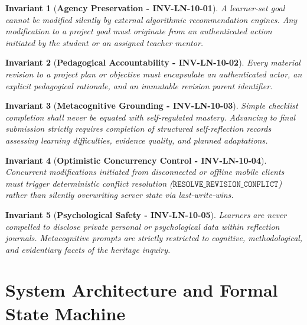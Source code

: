 \documentclass[11pt,a4paper]{article}
\newtheorem{invariant}{Invariant}
\begin{document}
\begin{invariant}[\textbf{Agency Preservation - INV-LN-10-01}]
A learner-set goal cannot be modified silently by external algorithmic recommendation engines. Any modification to a project goal must originate from an authenticated action initiated by the student or an assigned teacher mentor.
\end{invariant}

\begin{invariant}[\textbf{Pedagogical Accountability - INV-LN-10-02}]
Every material revision to a project plan or objective must encapsulate an authenticated actor, an explicit pedagogical rationale, and an immutable revision parent identifier.
\end{invariant}

\begin{invariant}[\textbf{Metacognitive Grounding - INV-LN-10-03}]
Simple checklist completion shall never be equated with self-regulated mastery. Advancing to final submission strictly requires completion of structured self-reflection records assessing learning difficulties, evidence quality, and planned adaptations.
\end{invariant}

\begin{invariant}[\textbf{Optimistic Concurrency Control - INV-LN-10-04}]
Concurrent modifications initiated from disconnected or offline mobile clients must trigger deterministic conflict resolution ($\mathtt{RESOLVE\_REVISION\_CONFLICT}$) rather than silently overwriting server state via last-write-wins.
\end{invariant}

\begin{invariant}[\textbf{Psychological Safety - INV-LN-10-05}]
Learners are never compelled to disclose private personal or psychological data within reflection journals. Metacognitive prompts are strictly restricted to cognitive, methodological, and evidentiary facets of the heritage inquiry.
\end{invariant}

\section{System Architecture and Formal State Machine}
\end{document}

